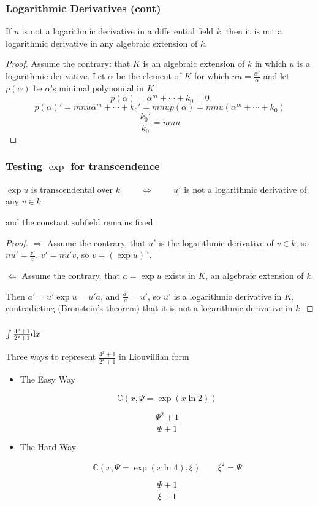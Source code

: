 \documentclass[aspectratio=169,dvipsnames]{beamer}
\begin{document}
\begin{frame}
\frametitle{Logarithmic Derivatives (cont)}
\begin{theorem}[Bronstein]
If $u$ is not a logarithmic derivative in a differential field $k$,
then it is not a logarithmic derivative in any algebraic extension of $k$.
\end{theorem}
\begin{proof}
Assume the contrary: that $K$ is an algebraic extension of $k$ in which $u$
is a logarithmic derivative.  Let $\alpha$ be the element of $K$ for which
$nu=\frac{\alpha'}{\alpha}$ and let $p(\alpha)$ be $\alpha$'s minimal polynomial in $K$
\[ p(\alpha) = \alpha^m + \cdots + k_0 = 0 \]
\[ p(\alpha)' = m n u \alpha^m + \cdots + k_0' = m n u p(\alpha) = m n u (\alpha^m + \cdots + k_0)\]
\[ \frac{k_0'}{k_0} = m n u \]
\end{proof}
\end{frame}

\begin{frame}
\frametitle{Testing $\exp$ for transcendence}
\begin{theorem}
$\exp u$ is transcendental over $k$
$\qquad\Longleftrightarrow\qquad$
$u'$ is not a logarithmic derivative of any $v \in k$

and the constant subfield remains fixed
\end{theorem}
\begin{proof}
$\Rightarrow$
Assume the contrary, that $u'$ is the logarithmic derivative of $v \in k$,
so $nu' = \frac{v'}{v}$.  $v' = n u' v$, so $v = (\exp u)^n$.
\bigskip

$\Leftarrow$
Assume the contrary, that $a=\exp u$ exists in $K$, an algebraic extension of $k$.

Then $a' = u' \exp u = u' a$, and $\frac{a'}{a} = u'$, so $u'$ is a logarithmic
derivative in $K$, contradicting (Bronstein's theorem)
that it is not a logarithmic derivative in $k$.
\end{proof}
\end{frame}

\begin{frame}
\frametitle{$\int \frac{4^x+1}{2^x+1} {\rm d} x$}
Three ways to represent $\frac{4^x+1}{2^x+1}$ in Liouvillian form
\begin{itemize}
\item The Easy Way

$${\mathbb C}(x,\Psi = \exp(x \ln 2))$$

$$ \frac{\Psi^2+1}{\Psi+1}$$

\item The Hard Way

$${\mathbb C}(x,\Psi = \exp(x \ln 4), \xi ) \qquad \xi^2=\Psi$$

$$ \frac{\Psi+1}{\xi+1}$$

\end{itemize}
\end{frame}
\end{document}
